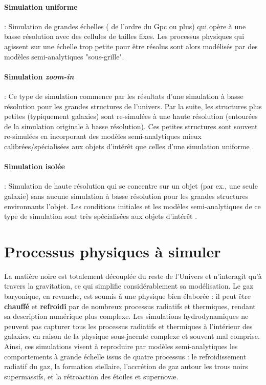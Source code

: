 \documentclass{article}
\begin{document}
\paragraph{Simulation uniforme}: Simulation de grandes échelles ( de l'ordre du Gpc ou plus) qui opère à une basse résolution avec des cellules de tailles fixes. Les processus physiques qui agissent sur une échelle trop petite pour être résolus sont alors modélisés par des modèles semi-analytiques "sous-grille".  

\paragraph{Simulation \textit{zoom-in}}: Ce type de simulation commence par les résultats d'une simulation à basse résolution pour les grandes structures de l’univers. Par la suite, les structures plus petites (typiquement galaxies) sont re-simulées à une haute résolution (entourées de la simulation originale à basse résolution). Ces petites structures sont souvent re-simulées en incorporant des modèles semi-analytiques mieux calibrées/spécialisées aux objets d'intérêt que celles d'une simulation uniforme \citep[par ex.,][]{ARTEMIS_sim}.

\paragraph{Simulation isolée}: Simulation de haute résolution qui se concentre sur un objet (par ex., une seule galaxie) sans aucune simulation à basse résolution pour les grandes structures environnants l'objet. Les conditions initiales et les modèles semi-analytiques de ce type de simulation sont très spécialisées aux objets d'intérêt \citep[par ex.,][]{NEXUS_isolated}.


\section{Processus physiques à simuler}

La matière noire est totalement découplée du reste de l'Univers et n'interagit qu'à travers la gravitation, ce qui simplifie considérablement sa modélisation. 
Le gaz baryonique, en revanche, est soumis à une physique bien élaborée : il peut être \textbf{chauffé} et \textbf{refroidi} par de nombreux processus radiatifs et thermiques, rendant sa description numérique plus complexe. Les simulations hydrodynamiques ne peuvent pas capturer tous les processus radiatifs et thermiques à l’intérieur des galaxies, en raison de la physique sous-jacente complexe et souvent mal comprise. Ainsi, ces simulations visent à reproduire par modèles semi-analytiques les comportements à grande échelle issus de quatre processus : le refroidissement radiatif du gaz, la formation stellaire, l’accrétion de gaz autour les trous noirs supermassifs, et la rétroaction des étoiles et supernovæ. 
\end{document}
